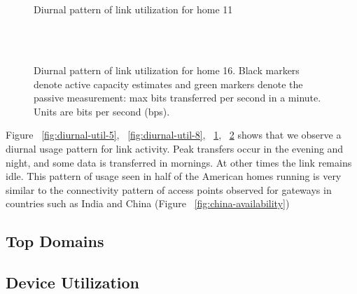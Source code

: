 \begin{figure}[t]
  \begin{minipage}{\linewidth}
  \\
  \\
  \caption{Diurnal pattern of link utilization for home 11}
  \label{fig:diurnal-util-11}
  \end{minipage}
\end{figure}  
  
\begin{figure}[t]
  \begin{minipage}{\linewidth}
  \\
  \\ 
  \caption{Diurnal pattern of link utilization for home 16. Black markers denote active capacity
  estimates and green markers denote the passive measurement: max bits transferred per second in
  a minute. Units are bits per second (bps).}
  \label{fig:diurnal-util-16}
  \end{minipage}
\end{figure}

Figure ~\ref{fig:diurnal-util-5}, ~\ref{fig:diurnal-util-8}, ~\ref{fig:diurnal-util-11},
~\ref{fig:diurnal-util-16} shows that we observe a diurnal usage pattern for link activity.
Peak transfers occur in the evening and night, and some data is transferred in mornings. At
other times the link remains idle. This pattern of usage seen in half of the American homes
running \passive{} is very similar to the connectivity pattern of access points observed for
gateways in \developing{} countries such as India and China (Figure ~\ref{fig:china-availability})


\subsection{Top Domains}


\subsection{Device Utilization}

